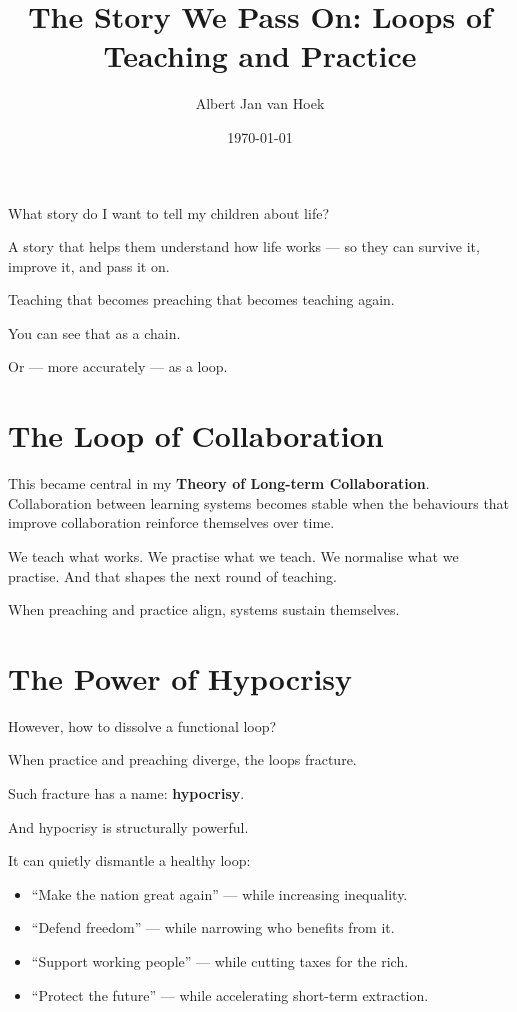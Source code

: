 \documentclass{article}
\title{The Story We Pass On: Loops of Teaching and Practice}
\author{Albert Jan van Hoek}
\date{\today}
\begin{document}
\maketitle

What story do I want to tell my children about life?

A story that helps them understand how life works — so they can survive it, improve it, and pass it on.

Teaching that becomes preaching that becomes teaching again.

You can see that as a chain.

Or — more accurately — as a loop.

\section*{The Loop of Collaboration}

This became central in my \textbf{Theory of Long-term Collaboration}.
Collaboration between learning systems becomes stable when the behaviours that improve collaboration reinforce themselves over time.

We teach what works.
We practise what we teach.
We normalise what we practise.
And that shapes the next round of teaching.

When preaching and practice align, systems sustain themselves.

\section*{The Power of Hypocrisy}

However, how to dissolve a functional loop?

When practice and preaching diverge, the loops fracture.

Such fracture has a name: \textbf{hypocrisy}.

And hypocrisy is structurally powerful.

It can quietly dismantle a healthy loop:
\begin{itemize}
    \item ``Make the nation great again'' — while increasing inequality.
    \item ``Defend freedom'' — while narrowing who benefits from it.
    \item ``Support working people'' — while cutting taxes for the rich.
    \item ``Protect the future'' — while accelerating short-term extraction.
\end{itemize}
\end{document}
